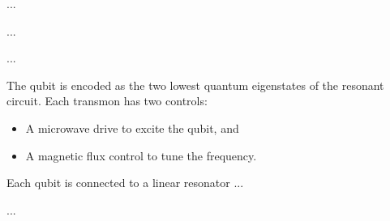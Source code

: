 ...

...

...

%
%
The qubit is encoded as the two lowest quantum eigenstates of the resonant
circuit. Each transmon has two controls:

\begin{itemize}
  \item  A microwave drive to excite the qubit, and
  \item A magnetic flux control to tune the frequency.
\end{itemize}

Each qubit is connected to a linear resonator ...

...